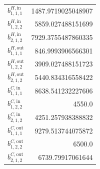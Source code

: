 \documentclass{article}%
\begin{document}
\begin{multicols*}{3}
\begin{supertabular}{lr}
	$b_{1,1,1}^{H,\text{in}}$ & 1487.9719025048907 \\%
	$b_{1,2,2}^{H,\text{in}}$ & 5859.027488151699 \\%
	$b_{2,1,2}^{H,\text{in}}$ & 7929.3755487860335 \\%
	$b_{1,1,1}^{H,\text{out}}$ & 846.9993906566301 \\%
	$b_{1,2,2}^{H,\text{out}}$ & 3909.027488151723 \\%
	$b_{2,1,2}^{H,\text{out}}$ & 5440.834316558422 \\%
	$b_{1,1,1}^{C,\text{in}}$ & 8638.541232227606 \\%
	$b_{1,2,2}^{C,\text{in}}$ & 4550.0 \\%
	$b_{2,1,2}^{C,\text{in}}$ & 4251.257938388832 \\%
	$b_{1,1,1}^{C,\text{out}}$ & 9279.513744075872 \\%
	$b_{1,2,2}^{C,\text{out}}$ & 6500.0 \\%
	$b_{2,1,2}^{C,\text{out}}$ & 6739.79917061644 \\%
\end{supertabular}%
\end{multicols*}%
\clearpage%
\end{document}
